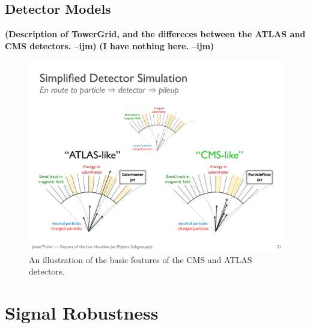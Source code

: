 \documentclass[11pt,letterpaper]{article}
\newcommand{\ijm}[1]{\textbf{\textcolor{llblue}{(#1 --ijm)}}}
\begin{document}
\subsection{Detector Models}\label{sec:det_model}

\ijm{Description of TowerGrid, and the differeces between the ATLAS and CMS detectors. }
\ijm{I have nothing here.}

\begin{figure}
\begin{center}
\includegraphics[width=1.0\columnwidth]{figures/CMS_vs_ATLAS_detector}
\end{center}
\caption{An illustration of the basic features of the CMS and ATLAS detectors.}
\end{figure}




\section{Signal Robustness}\label{sec:polar}
\end{document}

